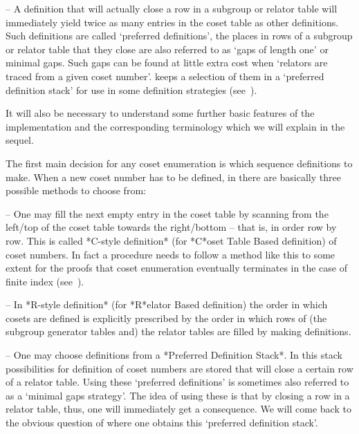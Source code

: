 \item{--} A definition that will actually close a row in a subgroup or
relator  table will  immediately yield  twice as  many entries  in the
coset  table  as  other  definitions.   Such  definitions  are  called
\lq preferred definitions', the places in rows of a subgroup or relator
table that they close are also  referred to as \lq gaps of length one' 
or minimal gaps. Such gaps  can be  found  at little  extra cost  when
\lq relators  are traced  from a  given  coset number'. {\ACE} keeps a
selection of  them in a \lq preferred  definition stack'  for  use  in
some definition strategies (see~\cite{Hav91}).

\endlist

It will also be necessary to understand some further basic features of
the  implementation and  the corresponding  terminology which  we will
explain in the sequel.


The first main decision for any coset enumeration is    which sequence
definitions  to  make. When a new  coset number has to  be defined, in
{\ACE} there are basically three possible methods to choose from:

\beginlist

\item{--}  One  may fill  the  next empty  entry  in  the coset  table
by scanning     from the  left/top  of  the  coset table  towards  the
right/bottom -- that is, in order  row by row. This is called *C-style
definition* (for *C*oset Table Based definition) of coset numbers.  In
fact a procedure needs to follow a method like this to some extent for
the proofs that coset enumeration eventually terminates in the case of
finite index (see~\cite{Neu82}).

\item{--} In *R-style definition* (for *R*elator Based definition) the
order  in which  cosets are  defined is  explicitly prescribed  by the
order in which rows of (the subgroup generator tables and) the relator
tables are filled by making definitions.

\item{--}  One may  choose  definitions from  a *Preferred  Definition
Stack*.  In  this stack possibilities for definition  of coset numbers
are stored  that will close a  certain row of a  relator table.  Using
these \lq preferred definitions' is sometimes also  referred  to as  a
\lq minimal gaps strategy'. The idea of using these is that by closing
a  row  in  a  relator table, thus,   one   will  immediately   get  a
consequence.  We will come back to the obvious question of  where  one
obtains this \lq preferred definition stack'.

